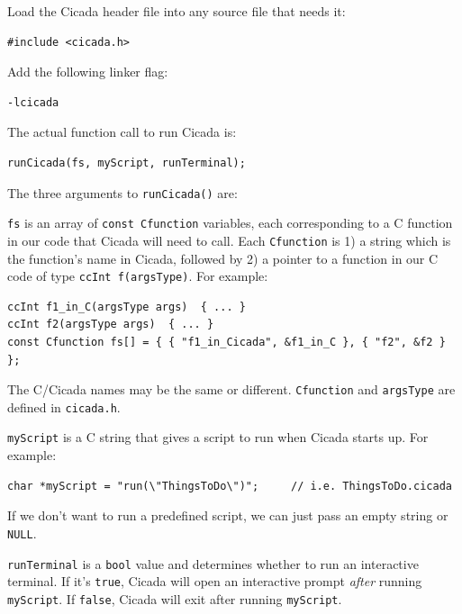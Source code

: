 \documentclass{article}
\newenvironment{code}{
       \begin{list}{}{
               \setlength{\leftmargin}{.4in}
               \setlength{\rightmargin}{0in}
               \setlength{\topsep}{.2in}
       }
       \small
       \item[] }
       { \end{list}   }
\begin{document}
\begin{itemize}
\item Load the Cicada header file into any source file that needs it:
\begin{code} \begin{verbatim}
#include <cicada.h>
\end{verbatim} \end{code}
\item Add the following linker flag:
\begin{code} \begin{verbatim}
-lcicada
\end{verbatim} \end{code}
\item The actual function call to run Cicada is:
\begin{code} \begin{verbatim}
runCicada(fs, myScript, runTerminal);
\end{verbatim} \end{code}
\end{itemize}

\noindent The three arguments to \verb#runCicada()# are:

\begin{enumerate}

\item \verb#fs# is an array of \verb#const Cfunction# variables, each corresponding to a C function in our code that Cicada will need to call.  Each \verb#Cfunction# is 1) a string which is the function's name in Cicada, followed by 2) a pointer to a function in our C code of type \verb#ccInt f(argsType)#.  For example:
\begin{code} \begin{verbatim}
ccInt f1_in_C(argsType args)  { ... }
ccInt f2(argsType args)  { ... }
const Cfunction fs[] = { { "f1_in_Cicada", &f1_in_C }, { "f2", &f2 } };
\end{verbatim} \end{code}
\noindent The C/Cicada names may be the same or different.  \verb#Cfunction# and \verb#argsType# are defined in \verb#cicada.h#.

\item \verb#myScript# is a C string that gives a script to run when Cicada starts up.  For example:
\begin{code} \begin{verbatim}
char *myScript = "run(\"ThingsToDo\")";     // i.e. ThingsToDo.cicada
\end{verbatim} \end{code}
\noindent If we don't want to run a predefined script, we can just pass an empty string or \verb#NULL#.

\item \verb#runTerminal# is a \verb#bool# value and determines whether to run an interactive terminal.  If it's \verb#true#, Cicada will open an interactive prompt \emph{after} running \verb#myScript#.  If \verb#false#, Cicada will exit after running \verb#myScript#.

\end{enumerate}
\end{document}
